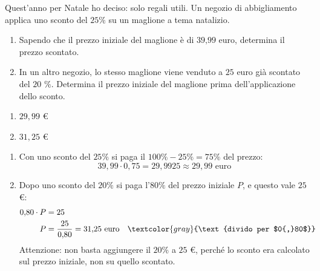 \begin{question}[ID=2.1, subtitle={Prezzo scontato del maglione natalizio}, tags={percentuali}, difficulty=facile]
Quest'anno per Natale ho deciso: solo regali utili. Un negozio di abbigliamento applica uno sconto del $\text{25\%}$ su un maglione a tema natalizio.

\begin{enumerate}
    \item Sapendo che il prezzo iniziale del maglione è di $\text{39,99}$ euro, determina il prezzo scontato.
    \color{gray}\item In un altro negozio, lo stesso maglione viene venduto a $\text{25}$ euro già scontato del $\text{20 \%}$. Determina il prezzo iniziale del maglione prima dell'applicazione dello sconto.
\end{enumerate}
\begin{solution}
\begin{enumerate}
    \item $29{,}99$ €
    \item $31{,}25$ €
\end{enumerate}
\end{solution}
\begin{explanation}
\begin{enumerate}
    \item Con uno sconto del $25\%$ si paga il $100\%-25\%=75\%$ del prezzo:
    \[ 39{,}99\cdot0{,}75=29{,}9925\approx29{,}99 \text{ euro} \]
    \item Dopo uno sconto del $20\%$ si paga l'$80\%$ del prezzo iniziale $P$, e questo vale $25$ €:
    \[\begin{aligned}
    0{,}80\cdot P &= 25\\
    P &= \dfrac{25}{0{,}80}=31{,}25 \text{ euro} && \textcolor{gray}{\text{divido per $0{,}80$}}
    \end{aligned}\]
    Attenzione: non basta aggiungere il $20\%$ a $25$ €, perché lo sconto era calcolato sul prezzo iniziale, non su quello scontato.
\end{enumerate}
\end{explanation}
\end{question}


